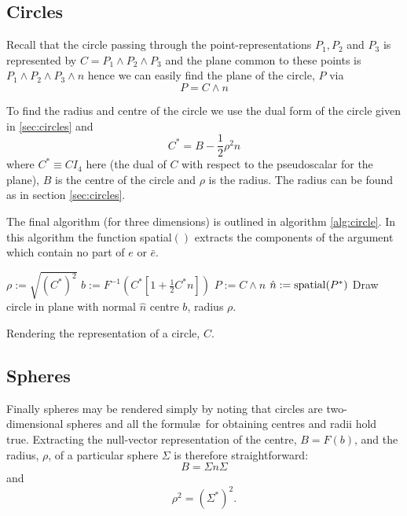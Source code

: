 \subsection{Circles}

Recall that the circle passing through the point-representations $P_1, P_2$ and $P_3$
is represented by $C = P_1 \wedge P_2 \wedge P_3$ and the plane common to these points is
$P_1 \wedge P_2 \wedge P_3 \wedge n$ hence we can easily find the plane of 
the circle, $P$ via
\[
P = C \wedge n
\]

To find the radius and centre of the circle we use the dual form of the 
circle given in \ref{sec:circles} and \cite{wareham_lasenby}
\[
C^* = B - \frac{1}{2}\rho^2n
\]
where $C^* \equiv CI_4$ here (the dual of $C$ with respect to the pseudoscalar 
for the plane), $B$ is the centre of the circle and $\rho$ is the radius. The
radius can be found as in section \ref{sec:circles}.
 
The final algorithm (for three dimensions) is outlined in algorithm \ref{alg:circle}.
In this algorithm the function spatial$()$ extracts the components of the argument
which contain no part of $e$ or $\bar{e}$.

\begin{fancyalg}
\begin{algorithmic}[1]
\STATE $\rho := \sqrt{(C^*)^2}$
\STATE $b := F^{-1}\left(C^* \left[ 1 + \frac{1}{2}C^*n \right]\right)$
\STATE $P := C \wedge n$
\STATE $\hat{n} := {\rm spatial}(P^*)$
\STATE Draw circle in plane with normal $\hat{n}$ centre
$b$, radius $\rho$.
\end{algorithmic}
\caption{\label{alg:circle}Rendering the representation of a circle, $C$.}
\end{fancyalg}

\subsection{Spheres}

Finally spheres may be rendered simply by noting that circles are two-dimensional
spheres and all the formul\ae\ for obtaining centres and radii hold true. Extracting
the null-vector representation of the centre, $B = F(b)$, and the radius, $\rho$,
of a particular sphere $\Sigma$ is therefore straightforward:
\[
B = \Sigma n \Sigma
\]
and
\[
\rho^2 = \left(\Sigma^*\right)^2.
\]

